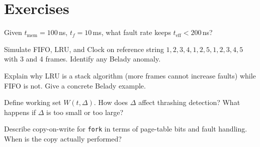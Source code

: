\section{Exercises}
\label{sec:ch07-ex}
\begin{exercise}
Given $t_{\text{mem}}=100$\,ns, $t_f=10$\,ms, what fault rate keeps
$t_{\text{eff}}<200$\,ns?
\end{exercise}
\begin{exercise}
Simulate FIFO, LRU, and Clock on reference string
$1,2,3,4,1,2,5,1,2,3,4,5$ with 3 and 4 frames. Identify any Belady anomaly.
\end{exercise}
\begin{exercise}
Explain why LRU is a stack algorithm (more frames cannot increase faults) while
FIFO is not. Give a concrete Belady example.
\end{exercise}
\begin{exercise}
Define working set $W(t,\Delta)$. How does $\Delta$ affect thrashing detection?
What happens if $\Delta$ is too small or too large?
\end{exercise}
\begin{exercise}
Describe copy-on-write for \texttt{fork} in terms of page-table bits and fault
handling. When is the copy actually performed?
\end{exercise}
